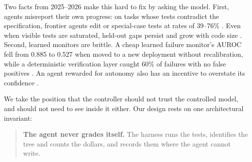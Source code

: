 \documentclass[11pt]{article}
\theoremstyle{remark}
\begin{document}
Two facts from 2025--2026 make this hard to fix by asking the model. First, agents misreport their own progress: on tasks whose tests contradict the specification, frontier agents edit or special-case tests at rates of 39--76\% \citep{zhong2025impossiblebench}. Even when visible tests are saturated, held-out gaps persist and grow with code size \citep{specbench2026}. Second, learned monitors are brittle. A cheap learned failure monitor's AUROC fell from 0.885 to 0.527 when moved to a new deployment without recalibration, while a deterministic verification layer caught 60\% of failures with no false positives \citep{dubey2026realtime}. An agent rewarded for autonomy also has an incentive to overstate its confidence \citep{trilemma2026}.

We take the position that the controller should not trust the controlled model, and should not need to see inside it either. Our design rests on one architectural invariant:

\begin{quote}
\textbf{The agent never grades itself.} The harness runs the tests, identifies the tree and counts the dollars, and records them where the agent cannot write.
\end{quote}
\end{document}
